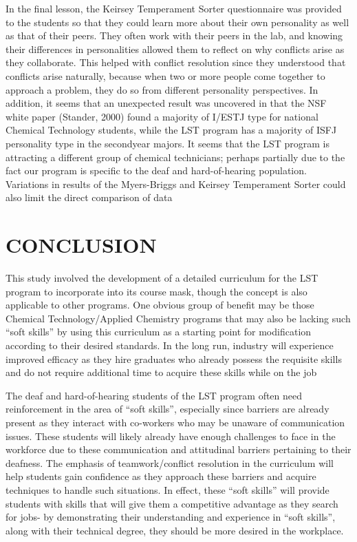 \documentclass[11.5pt]{sig-alternate} %
\begin{document}
\begin{large}
In the final lesson, the Keirsey Temperament Sorter questionnaire was provided to the students so that they could learn more about their own personality as well as that of their peers. They often work with their peers in the lab, and knowing their differences in personalities allowed them to reflect on why conflicts arise as they collaborate. This helped with conflict resolution since they understood that conflicts arise naturally, because when two or more people come together to approach a problem, they do so from different personality perspectives. In addition, it seems that an unexpected result was uncovered in that the NSF white paper (Stander, 2000) found a majority of I/ESTJ type for national Chemical Technology students, while the LST program has a majority of ISFJ personality type in the secondyear majors. It seems that the LST program is attracting a different group of chemical technicians; perhaps partially due to the fact our program is specific to the deaf and hard-of-hearing population. Variations in results of the Myers-Briggs and Keirsey Temperament Sorter could also limit the direct comparison of data

\section*{CONCLUSION}

This study involved the development of a detailed curriculum for the LST program to incorporate into its course mask, though the concept is also applicable to other programs. One obvious group of benefit may be those Chemical Technology/Applied Chemistry programs that may also be lacking such “soft skills” by using this curriculum as a starting point for modification according to their desired standards. In the long run, industry will experience improved efficacy as they hire graduates who already possess the requisite skills and do not require additional time to acquire these skills while on the job

The deaf and hard-of-hearing students of the LST program often need reinforcement in the area of “soft skills”, especially since barriers are already present as they interact with co-workers who may be unaware of communication issues. These students will likely already have enough challenges to face in the workforce due to these communication and attitudinal barriers pertaining to their deafness. The emphasis of teamwork/conflict resolution in the curriculum will help students gain confidence as they approach these barriers and acquire techniques to handle such situations. In effect, these “soft skills” will provide students with skills that will give them a competitive advantage as they search for jobs- by demonstrating their understanding and experience in “soft skills”, along with their technical degree, they should be more desired in the workplace.


\end{large}
\end{document}
